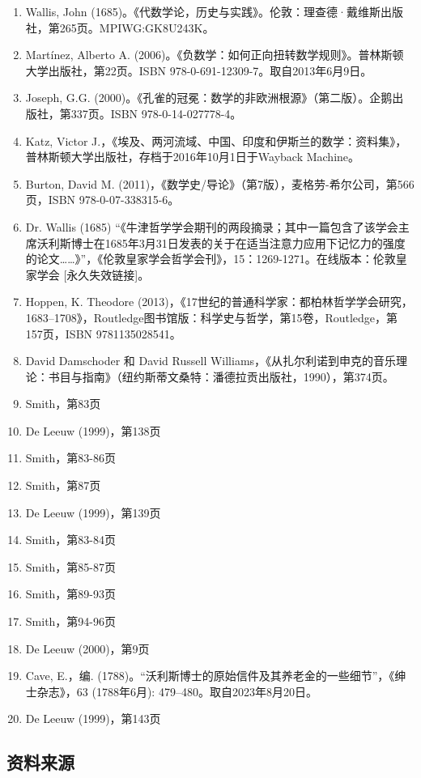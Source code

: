 \begin{enumerate}
\item Wallis, John (1685)。《代数学论，历史与实践》。伦敦：理查德·戴维斯出版社，第265页。MPIWG:GK8U243K。
\item Martínez, Alberto A. (2006)。《负数学：如何正向扭转数学规则》。普林斯顿大学出版社，第22页。ISBN 978-0-691-12309-7。取自2013年6月9日。
\item Joseph, G.G. (2000)。《孔雀的冠冕：数学的非欧洲根源》（第二版）。企鹅出版社，第337页。ISBN 978-0-14-027778-4。
\item Katz, Victor J.，《埃及、两河流域、中国、印度和伊斯兰的数学：资料集》，普林斯顿大学出版社，存档于2016年10月1日于Wayback Machine。
\item Burton, David M. (2011)，《数学史/导论》（第7版），麦格劳-希尔公司，第566页，ISBN 978-0-07-338315-6。
\item Dr. Wallis (1685) “《牛津哲学学会期刊的两段摘录；其中一篇包含了该学会主席沃利斯博士在1685年3月31日发表的关于在适当注意力应用下记忆力的强度的论文……》”，《伦敦皇家学会哲学会刊》，15：1269-1271。在线版本：伦敦皇家学会 [永久失效链接]。
\item Hoppen, K. Theodore (2013)，《17世纪的普通科学家：都柏林哲学学会研究，1683–1708》，Routledge图书馆版：科学史与哲学，第15卷，Routledge，第157页，ISBN 9781135028541。
\item David Damschoder 和 David Russell Williams，《从扎尔利诺到申克的音乐理论：书目与指南》（纽约斯蒂文桑特：潘德拉贡出版社，1990），第374页。
\item Smith，第83页
\item De Leeuw (1999)，第138页
\item Smith，第83-86页
\item Smith，第87页
\item De Leeuw (1999)，第139页
\item Smith，第83-84页
\item Smith，第85-87页
\item Smith，第89-93页
\item Smith，第94-96页
\item De Leeuw (2000)，第9页
\item Cave, E.，编. (1788)。“沃利斯博士的原始信件及其养老金的一些细节”，《绅士杂志》，63 (1788年6月): 479–480。取自2023年8月20日。
\item  De Leeuw (1999)，第143页
\end{enumerate}
\subsection{资料来源}

